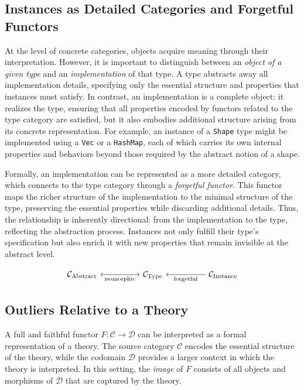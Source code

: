 \subsection{Instances as Detailed Categories and Forgetful Functors}

At the level of concrete categories, objects acquire meaning through their interpretation. However, it is important to distinguish between an \emph{object of a given type} and an \emph{implementation} of that type. A type abstracts away all implementation details, specifying only the essential structure and properties that instances must satisfy. In contrast, an implementation is a complete object: it realizes the type, ensuring that all properties encoded by functors related to the type category are satisfied, but it also embodies additional structure arising from its concrete representation. For example, an instance of a \texttt{Shape} type might be implemented using a \texttt{Vec} or a \texttt{HashMap}, each of which carries its own internal properties and behaviors beyond those required by the abstract notion of a shape.

Formally, an implementation can be represented as a more detailed category, which connects to the type category through a \emph{forgetful functor}. This functor maps the richer structure of the implementation to the minimal structure of the type, preserving the essential properties while discarding additional details. Thus, the relationship is inherently directional: from the implementation to the type, reflecting the abstraction process. Instances not only fulfill their type’s specification but also enrich it with new properties that remain invisible at the abstract level.

\[
\begin{tikzcd}[column sep=huge]
\mathcal{C}_{\text{Abstract}} \arrow[r, leftrightarrow, "\text{isomorphic}"'] & \mathcal{C}_{\text{Type}}  \arrow[r, leftarrow, "\text{forgetful}"'] & \mathcal{C}_{\text{Instance}}
\end{tikzcd}
\]

\subsection{Outliers Relative to a Theory}

A full and faithful functor \( F: \mathcal{C} \to \mathcal{D} \) can be interpreted as a formal representation of a theory. The source category \( \mathcal{C} \) encodes the essential structure of the theory, while the codomain \( \mathcal{D} \) provides a larger context in which the theory is interpreted. In this setting, the \emph{image} of \( F \) consists of all objects and morphisms of \( \mathcal{D} \) that are captured by the theory.

